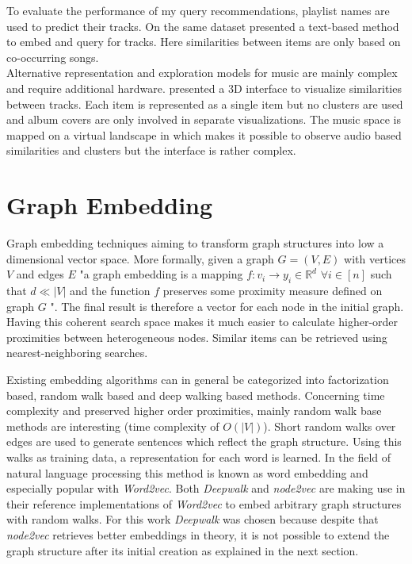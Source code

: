 \documentclass[sigconf]{acmart}
\begin{document}
To evaluate the performance of my query recommendations, playlist names are used to predict their tracks. On the same dataset \cite{chungexploiting} presented a text-based method to embed and query for tracks. Here similarities between items are only based on co-occurring songs. \\

Alternative representation and exploration models for music are mainly complex and require additional hardware. \cite{lamere2007using} presented a 3D interface to visualize similarities between tracks. Each item is represented as a single item but no clusters are used and album covers are only involved in separate visualizations. The music space is mapped on a virtual landscape in \cite{knees2007exploring} which makes it possible to observe audio based similarities and clusters but the interface is rather complex.

\section{Graph Embedding}
Graph embedding techniques aiming to transform graph structures into low a dimensional vector space. More formally, given a graph $ G = (V,E) $ with vertices $ V $ and edges $ E $ "a graph embedding is a mapping $ f : v_{i} \rightarrow y_{i} \in \mathbb{R}^{d} $ $ \forall i \in [n] $ such that $ d \ll |V| $ and the function $ f $ preserves some proximity measure defined on graph $ G $ "\cite{goyal2017graph}. The final result is therefore a vector for each node in the initial graph. Having this coherent search space makes it much easier to calculate higher-order proximities between heterogeneous nodes. Similar items can be retrieved using nearest-neighboring searches.

Existing embedding algorithms can in general be categorized into factorization based, random walk based and deep walking based methods. Concerning time complexity and preserved higher order proximities, mainly random walk base methods are interesting (time complexity of $ O(|V|) $). Short random walks over edges are used to generate sentences which reflect the graph structure. Using this walks as training data, a representation for each word is learned. In the field of natural language processing this method is known as word embedding and especially popular with \emph{Word2vec}\cite{mikolov2013efficient}. Both \emph{Deepwalk}\cite{perozzi2014deepwalk} and \emph{node2vec}\cite{grover2016node2vec} are making use in their reference implementations of \emph{Word2vec} to embed arbitrary graph structures with random walks. For this work \emph{Deepwalk} was chosen because despite that \emph{node2vec} retrieves better embeddings in theory, it is not possible to extend the graph structure after its initial creation as explained in the next section.
\end{document}
